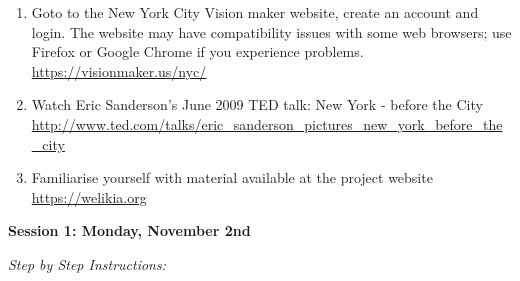 \documentclass{article}
\begin{document}
\begin{enumerate}[leftmargin=15mm]

\item Goto to the New York City Vision maker website, create an account and login.  The website may have compatibility issues with some web browsers; use Firefox or Google Chrome if you experience problems. \\ 
\url{https://visionmaker.us/nyc/}

\item Watch Eric Sanderson's June 2009 TED talk: New York - before the City \\  
\url{http://www.ted.com/talks/eric_sanderson_pictures_new_york_before_the_city}

\item Familiarise yourself with material available at the project website \\ 
\url{https://welikia.org}

\end{enumerate}



\large{\textbf{Session 1: Monday, November 2nd}}

\vspace{4mm}
\setlength{\leftskip}{1cm}
\textit{Step by Step Instructions:}
\end{document}
